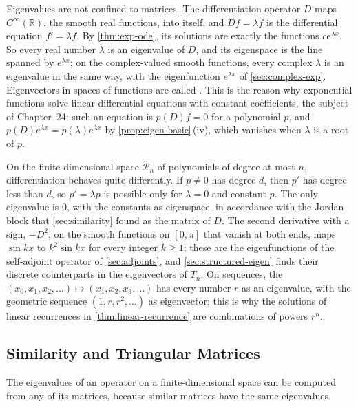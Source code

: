 Eigenvalues are not confined to matrices. The differentiation operator $D$ maps $C^\infty(\mathbb R)$, the smooth real functions, into itself, and $Df=\lambda f$ is the differential equation $f'=\lambda f$. By \cref{thm:exp-ode}, its solutions are exactly the functions $ce^{\lambda x}$. So every real number $\lambda$ is an eigenvalue of $D$, and its eigenspace is the line spanned by $e^{\lambda x}$; on the complex-valued smooth functions, every complex $\lambda$ is an eigenvalue in the same way, with the eigenfunction $e^{\lambda x}$ of \cref{sec:complex-exp}. Eigenvectors in spaces of functions are called . This is the reason why exponential functions solve linear differential equations with constant coefficients, the subject of Chapter~24: such an equation is $p(D)f=0$ for a polynomial $p$, and $p(D)e^{\lambda x}=p(\lambda)e^{\lambda x}$ by \cref{prop:eigen-basic}\,(iv), which vanishes when $\lambda$ is a root of $p$.

On the finite-dimensional space $\mathcal P_n$ of polynomials of degree at most $n$, differentiation behaves quite differently. If $p\ne0$ has degree $d$, then $p'$ has degree less than $d$, so $p'=\lambda p$ is possible only for $\lambda=0$ and constant $p$. The only eigenvalue is $0$, with the constants as eigenspace, in accordance with the Jordan block that \cref{sec:similarity} found as the matrix of $D$. The second derivative with a sign, $-D^2$, on the smooth functions on $[0,\pi]$ that vanish at both ends, maps $\sin kx$ to $k^2\sin kx$ for every integer $k\ge1$; these are the eigenfunctions of the self-adjoint operator of \cref{sec:adjoints}, and \cref{sec:structured-eigen} finds their discrete counterparts in the eigenvectors of $T_n$. On sequences, the  $(x_0,x_1,x_2,\ldots)\mapsto(x_1,x_2,x_3,\ldots)$ has every number $r$ as an eigenvalue, with the geometric sequence $(1,r,r^2,\ldots)$ as eigenvector; this is why the solutions of linear recurrences in \cref{thm:linear-recurrence} are combinations of powers $r^n$.

\subsection{Similarity and Triangular Matrices}

The eigenvalues of an operator on a finite-dimensional space can be computed from any of its matrices, because similar matrices have the same eigenvalues.

